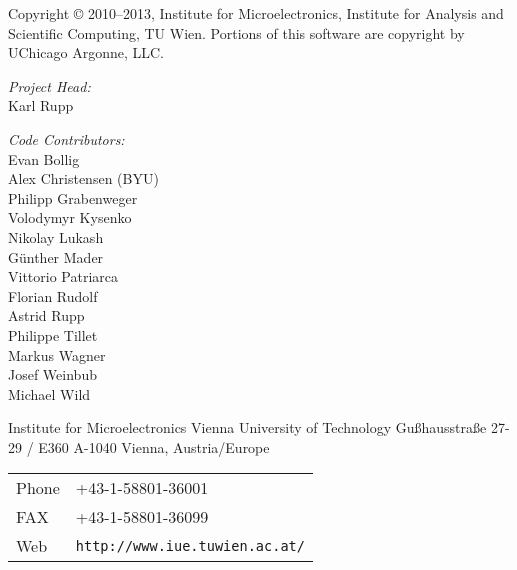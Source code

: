 
\clearpage

Copyright {\copyright} 2010--2013, Institute for Microelectronics,
                            Institute for Analysis and Scientific Computing,
                            TU Wien.
Portions of this software are copyright by UChicago Argonne, LLC.

\vspace{2.cm}

\textit{Project Head:}\\ 

Karl Rupp\\

\vspace{2.cm}

\textit{Code Contributors:} \\

Evan Bollig \\
Alex Christensen (BYU) \\
Philipp Grabenweger \\
Volodymyr Kysenko \\
Nikolay Lukash \\
G\"unther Mader \\
Vittorio Patriarca \\
Florian Rudolf \\
Astrid Rupp \\
Philippe Tillet \\
Markus Wagner \\
Josef Weinbub \\
Michael Wild \\



\vspace{4.0cm}

Institute for Microelectronics\newline
Vienna University of Technology\newline
Gu\ss hausstra\ss e 27-29 / E360\newline
A-1040 Vienna, Austria/Europe\newline


\begin{tabular}{ll}
Phone  & +43-1-58801-36001\\
FAX    & +43-1-58801-36099\\
Web    & \texttt{http://www.iue.tuwien.ac.at/}
\end{tabular}




